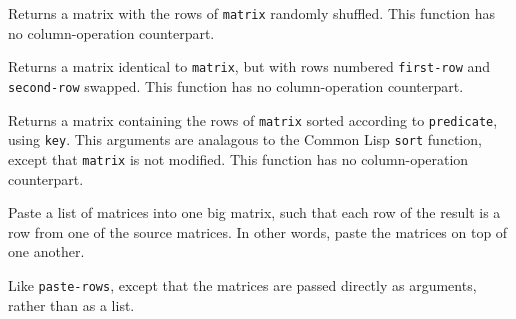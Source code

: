 \begin{description}
\item{}

\item{}
Returns a matrix with the rows of {\tt matrix} randomly shuffled.
This function has no column-operation counterpart.

\item{}
Returns a matrix identical to {\tt matrix},
but with rows numbered {\tt first-row} and {\tt second-row} swapped.
This function has no column-operation counterpart.

\item{}
Returns a matrix containing the rows of {\tt matrix} 
sorted according to {\tt predicate}, using {\tt key}.
This arguments are analagous to the Common Lisp {\tt sort} function,
except that {\tt matrix} is not modified.
This function has no column-operation counterpart.

\item{}
Paste a list of matrices into one big matrix,
such that each row of the result is a row from one of the
source matrices. In other words, paste the matrices
on top of one another.

\item{}

\item{}
Like {\tt paste-rows}, except that the matrices
are passed directly as arguments, rather than as a list.

\item{}

\end{description}



